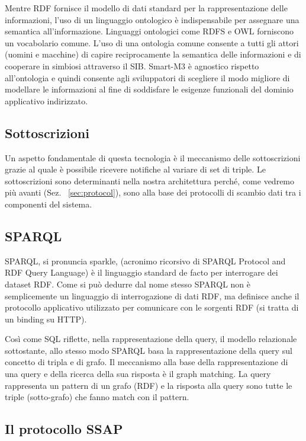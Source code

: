 Mentre RDF fornisce il modello di dati standard per la rappresentazione delle informazioni, l'uso di un linguaggio ontologico è indispensabile per assegnare una semantica all'informazione. Linguaggi ontologici come RDFS e OWL forniscono un vocabolario comune. L'uso di una ontologia comune consente a tutti gli attori (uomini e macchine) di capire reciprocamente la semantica delle informazioni e di cooperare in simbiosi attraverso il SIB. Smart-M3 è agnostico rispetto all'ontologia e quindi consente agli sviluppatori di scegliere il modo migliore di modellare le informazioni al fine di soddisfare le esigenze funzionali del dominio applicativo indirizzato.

\subsection{Sottoscrizioni}

Un aspetto fondamentale di questa tecnologia è il meccanismo delle sottoscrizioni grazie al quale è possibile ricevere notifiche al variare di set di triple. Le sottoscrizioni sono determinanti nella nostra architettura perché, come vedremo più avanti (Sez. ~\ref{sec:protocol}), sono alla base dei protocolli di scambio dati tra i componenti del sistema.

\subsection{SPARQL}

SPARQL, si pronuncia sparkle, (acronimo ricorsivo di SPARQL Protocol and RDF Query Language) è il linguaggio standard de facto per interrogare dei dataset RDF. Come si può dedurre dal nome stesso SPARQL non è semplicemente un linguaggio di interrogazione di dati RDF, ma definisce anche il protocollo applicativo utilizzato per comunicare con le sorgenti RDF (si tratta di un binding su HTTP).

Così come SQL riflette, nella rappresentazione della query, il modello relazionale sottostante, allo stesso modo SPARQL basa la rappresentazione della query sul concetto di tripla e di grafo. Il meccanismo alla base della rappresentazione di una query e della ricerca della sua risposta è il graph matching. La query rappresenta un pattern di un grafo (RDF) e la risposta alla query sono tutte le triple (sotto-grafo) che fanno match con il pattern.

\subsection{Il protocollo SSAP}

